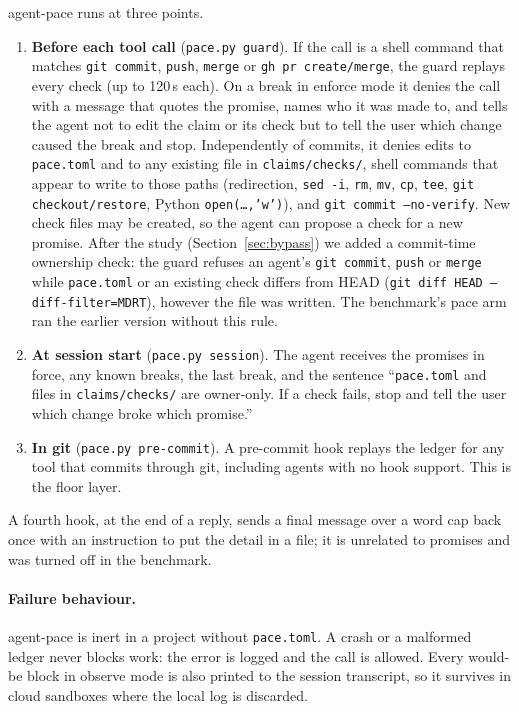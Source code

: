 \documentclass[11pt]{article}
\newcommand{\pace}{\textsf{agent-pace}}
\newcommand{\arm}[1]{\textsf{#1}}
\begin{document}
\pace{} runs at three points.
\begin{enumerate}
  \item \textbf{Before each tool call} (\texttt{pace.py guard}). If the call is a shell command that matches \texttt{git commit}, \texttt{push}, \texttt{merge} or \texttt{gh pr create/merge}, the guard replays every check (up to 120\,s each). On a break in enforce mode it denies the call with a message that quotes the promise, names who it was made to, and tells the agent not to edit the claim or its check but to tell the user which change caused the break and stop. Independently of commits, it denies edits to \texttt{pace.toml} and to any existing file in \texttt{claims/checks/}, shell commands that appear to write to those paths (redirection, \texttt{sed -i}, \texttt{rm}, \texttt{mv}, \texttt{cp}, \texttt{tee}, \texttt{git checkout/restore}, Python \texttt{open(\ldots,'w')}), and \texttt{git commit --no-verify}. New check files may be created, so the agent can propose a check for a new promise. After the study (Section~\ref{sec:bypass}) we added a commit-time ownership check: the guard refuses an agent's \texttt{git commit}, \texttt{push} or \texttt{merge} while \texttt{pace.toml} or an existing check differs from HEAD (\texttt{git diff HEAD --diff-filter=MDRT}), however the file was written. The benchmark's \arm{pace} arm ran the earlier version without this rule.
  \item \textbf{At session start} (\texttt{pace.py session}). The agent receives the promises in force, any known breaks, the last break, and the sentence ``\texttt{pace.toml} and files in \texttt{claims/checks/} are owner-only. If a check fails, stop and tell the user which change broke which promise.''
  \item \textbf{In git} (\texttt{pace.py pre-commit}). A pre-commit hook replays the ledger for any tool that commits through git, including agents with no hook support. This is the floor layer.
\end{enumerate}
A fourth hook, at the end of a reply, sends a final message over a word cap back once with an instruction to put the detail in a file; it is unrelated to promises and was turned off in the benchmark.

\paragraph{Failure behaviour.} \pace{} is inert in a project without \texttt{pace.toml}. A crash or a malformed ledger never blocks work: the error is logged and the call is allowed. Every would-be block in observe mode is also printed to the session transcript, so it survives in cloud sandboxes where the local log is discarded.
\end{document}
